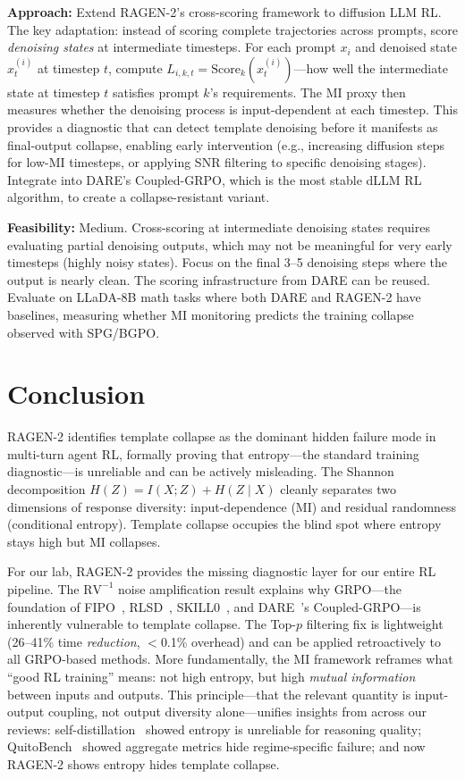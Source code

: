 \documentclass[11pt]{article}
\begin{document}
\textbf{Approach:} Extend RAGEN-2's cross-scoring framework to diffusion LLM RL. The key adaptation: instead of scoring complete trajectories across prompts, score \textit{denoising states} at intermediate timesteps. For each prompt $x_i$ and denoised state $x_t^{(i)}$ at timestep $t$, compute $L_{i,k,t} = \mathrm{Score}_k(x_t^{(i)})$---how well the intermediate state at timestep $t$ satisfies prompt $k$'s requirements. The MI proxy then measures whether the denoising process is input-dependent at each timestep. This provides a diagnostic that can detect template denoising before it manifests as final-output collapse, enabling early intervention (e.g., increasing diffusion steps for low-MI timesteps, or applying SNR filtering to specific denoising stages). Integrate into DARE's Coupled-GRPO, which is the most stable dLLM RL algorithm, to create a collapse-resistant variant.

\textbf{Feasibility:} Medium. Cross-scoring at intermediate denoising states requires evaluating partial denoising outputs, which may not be meaningful for very early timesteps (highly noisy states). Focus on the final 3--5 denoising steps where the output is nearly clean. The scoring infrastructure from DARE can be reused. Evaluate on LLaDA-8B math tasks where both DARE and RAGEN-2 have baselines, measuring whether MI monitoring predicts the training collapse observed with SPG/BGPO.

\section{Conclusion}

RAGEN-2 identifies template collapse as the dominant hidden failure mode in multi-turn agent RL, formally proving that entropy---the standard training diagnostic---is unreliable and can be actively misleading. The Shannon decomposition $H(Z) = I(X;Z) + H(Z \mid X)$ cleanly separates two dimensions of response diversity: input-dependence (MI) and residual randomness (conditional entropy). Template collapse occupies the blind spot where entropy stays high but MI collapses.

For our lab, RAGEN-2 provides the missing diagnostic layer for our entire RL pipeline. The $\mathrm{RV}^{-1}$ noise amplification result explains why GRPO---the foundation of FIPO~\cite{fipo}, RLSD~\cite{rlsd}, SKILL0~\cite{skill0}, and DARE~\cite{dare}'s Coupled-GRPO---is inherently vulnerable to template collapse. The Top-$p$ filtering fix is lightweight (26--41\% time \textit{reduction}, $<$0.1\% overhead) and can be applied retroactively to all GRPO-based methods. More fundamentally, the MI framework reframes what ``good RL training'' means: not high entropy, but high \textit{mutual information} between inputs and outputs. This principle---that the relevant quantity is input-output coupling, not output diversity alone---unifies insights from across our reviews: self-distillation~\cite{selfdistill} showed entropy is unreliable for reasoning quality; QuitoBench~\cite{quitobench} showed aggregate metrics hide regime-specific failure; and now RAGEN-2 shows entropy hides template collapse.
\end{document}

